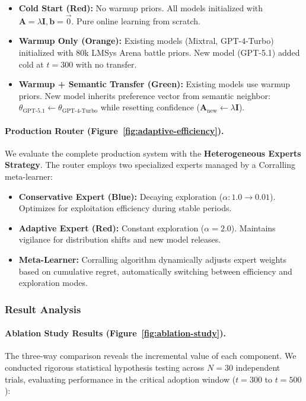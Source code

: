 \begin{itemize}
    \item \textbf{Cold Start (Red):} No warmup priors. All models initialized with $\mathbf{A}=\lambda \mathbf{I}, \mathbf{b}=\vec{0}$. Pure online learning from scratch.
    
    \item \textbf{Warmup Only (Orange):} Existing models (Mixtral, GPT-4-Turbo) initialized with 80k LMSys Arena battle priors. New model (GPT-5.1) added cold at $t=300$ with no transfer.
    
    \item \textbf{Warmup + Semantic Transfer (Green):} Existing models use warmup priors. New model inherits preference vector from semantic neighbor: $\theta_{\text{GPT-5.1}} \leftarrow \theta_{\text{GPT-4-Turbo}}$ while resetting confidence ($\mathbf{A}_{\text{new}} \leftarrow \lambda \mathbf{I}$).
\end{itemize}

\paragraph{Production Router (Figure~\ref{fig:adaptive-efficiency}).}
We evaluate the complete production system with the \textbf{Heterogeneous Experts Strategy}. The router employs two specialized experts managed by a Corralling meta-learner:

\begin{itemize}
    \item \textbf{Conservative Expert (Blue):} Decaying exploration ($\alpha: 1.0 \to 0.01$). Optimizes for exploitation efficiency during stable periods.
    
    \item \textbf{Adaptive Expert (Red):} Constant exploration ($\alpha = 2.0$). Maintains vigilance for distribution shifts and new model releases.
    
    \item \textbf{Meta-Learner:} Corralling algorithm dynamically adjusts expert weights based on cumulative regret, automatically switching between efficiency and exploration modes.
\end{itemize}

\subsubsection{Result Analysis}

\paragraph{Ablation Study Results (Figure~\ref{fig:ablation-study}).} 
The three-way comparison reveals the incremental value of each component. We conducted rigorous statistical hypothesis testing across $N=30$ independent trials, evaluating performance in the critical adoption window ($t=300$ to $t=500$):

